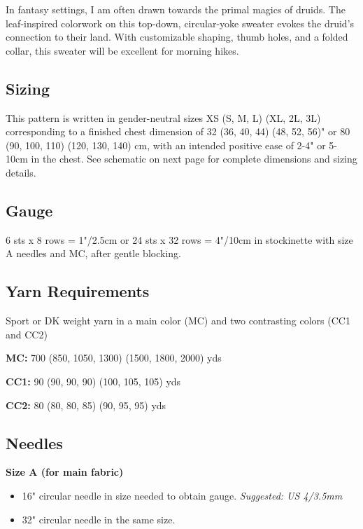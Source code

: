 \documentclass[12pt]{article}
\begin{document}
\begin{multicols}{2}

In fantasy settings, I am often drawn towards the primal magics of druids. The leaf-inspired colorwork on this top-down, circular-yoke sweater evokes the druid's connection to their land. With customizable shaping, thumb holes, and a folded collar, this sweater will be excellent for morning hikes.

\subsection*{Sizing}

This pattern is written in gender-neutral sizes XS (S, M, L) (XL, 2L, 3L) corresponding to a finished chest dimension of 
32 (36, 40, 44) (48, 52, 56)" or 
80 (90, 100, 110) (120, 130, 140) cm, 
with an intended positive ease of 2-4" or 5-10cm in the chest. See schematic on next page for complete dimensions and sizing details.

\subsection*{Gauge}

6 sts x 8 rows = 1"/2.5cm or 24 sts x 32 rows = 4"/10cm in stockinette with size A needles and MC, after gentle blocking.


\subsection*{Yarn Requirements}

Sport or DK weight yarn in a main color (MC) and two contrasting colors (CC1 and CC2)

 \textbf{MC:} 700 (850, 1050, 1300) (1500, 1800, 2000) yds

\textbf{CC1:} 90 (90, 90, 90) (100, 105, 105) yds

\textbf{CC2:} 80 (80, 80, 85) (90, 95, 95) yds


\subsection*{Needles}

\textbf{Size A (for main fabric)}
\begin{itemize}
\item 16" circular needle in size needed to obtain gauge. \emph{Suggested: US 4/3.5mm}
\item 32" circular needle in the same size.
\end{itemize}


\end{multicols}
\end{document}
